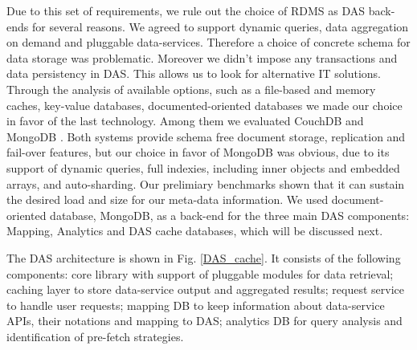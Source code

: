 \documentclass[a4paper]{jpconf}
\begin{document}
\noindent
Due to this set of requirements, we rule out the choice of RDMS as DAS back-ends
for several reasons. We agreed to support dynamic queries, data
aggregation on demand and pluggable data-services. Therefore a choice 
of concrete schema for data storage was problematic. Moreover we didn't impose
any transactions and data persistency in DAS. This allows us to look 
for alternative IT solutions.
Through the analysis of available options, such as a file-based and memory caches, 
key-value databases, documented-oriented databases we made our choice in favor 
of the last technology. Among them we evaluated CouchDB \cite{CouchDB} and 
MongoDB \cite{MongoDB}. Both systems provide schema free document
storage, replication and fail-over features, but our choice in favor of 
MongoDB was obvious, due to its support of dynamic queries, 
full indexies, including inner objects and embedded arrays,
and auto-sharding. Our prelimiary benchmarks shown that it can sustain
the desired load and size for our meta-data information. We used 
document-oriented database, MongoDB, as a back-end for the three 
main DAS components: Mapping, Analytics and DAS cache databases, 
which will be discussed next. 

The DAS architecture is shown in Fig. \ref{DAS_cache}. It consists of the
following components:
core library with support of pluggable modules for data retrieval;
caching layer to store data-service output and aggregated results;
request service to handle user requests;
mapping DB to keep information about data-service APIs, their
notations and mapping to DAS;
analytics DB for query analysis and identification of pre-fetch 
strategies.
\end{document}
